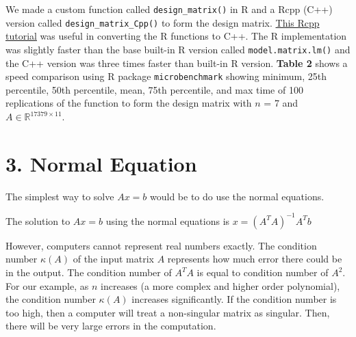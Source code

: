 \documentclass[
]{article}
\begin{document}
We made a custom function called \texttt{design\_matrix()} in R and a
Rcpp (C++) version called \texttt{design\_matrix\_Cpp()} to form the
design matrix. \color{blue}
\href{https://teuder.github.io/rcpp4everyone_en/index.html}{This Rcpp tutorial}
\color{black} was useful in converting the R functions to C++. The R
implementation was slightly faster than the base built-in R version
called \texttt{model.matrix.lm()} and the C++ version was three times
faster than built-in R version. \textbf{Table 2} shows a speed
comparison using R package \texttt{microbenchmark} showing minimum, 25th
percentile, 50th percentile, mean, 75th percentile, and max time of 100
replications of the function to form the design matrix with \(n\) = 7
and \(A \in \mathbb{R}^{17379 \times 11}\).

\hypertarget{normal-equation}{%
\section{3. Normal Equation}\label{normal-equation}}

The simplest way to solve \(Ax = b\) would be to do use the normal
equations.

The solution to \(Ax = b\) using the normal equations is
\(x = (A^{T}A)^{-1}A^{T}b\)

However, computers cannot represent real numbers exactly. The condition
number \(\kappa(A)\) of the input matrix \(A\) represents how much error
there could be in the output. The condition number of \(A^{T}A\) is
equal to condition number of \(A^{2}\). For our example, as \(n\)
increases (a more complex and higher order polynomial), the condition
number \(\kappa(A)\) increases significantly. If the condition number is
too high, then a computer will treat a non-singular matrix as singular.
Then, there will be very large errors in the computation.
\end{document}
